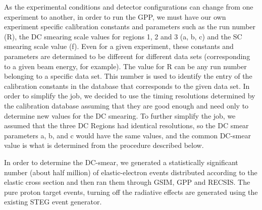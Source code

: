 As the experimental conditions and detector configurations can change from one experiment to another, in order to run the GPP, we must have our own experiment specific calibration constants and parameters such as the run number (R), the DC smearing scale values for regions 1, 2 and 3 (a, b, c) and the SC smearing scale value (f). Even for a given experiment, these constants and parameters are determined to be different for different data sets (corresponding to a given beam energy, for example). The value for R can be any run number belonging to a specific data set. This number is used to identify the entry of the calibration constants in the database that corresponds to the given data set.  In order to simplify the job, we decided to use the timing resolutions determined by the calibration database assuming that they are good enough and need only to determine new values for the DC smearing. %
To further simplify the job, we assumed that the three DC Regions had identical resolutions, so the DC smear parameters a, b, and c would have the same values, and the common DC-smear value is what is determined from the procedure described below.



In order to determine the DC-smear, we generated a statistically significant number (about half million) of elastic-electron events distributed according to the elastic cross section and then ran them through GSIM, GPP and RECSIS. The pure proton target events, turning off the radiative effects are generated using the existing %
STEG event generator. %

